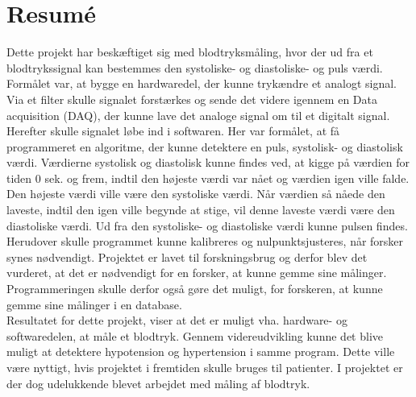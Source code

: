 \chapter{Resumé}
Dette projekt har beskæftiget sig med blodtryksmåling, hvor der ud fra et blodtrykssignal kan bestemmes den systoliske- og diastoliske- og puls værdi. Formålet var, at bygge en hardwaredel, der kunne trykændre et analogt signal. Via et filter skulle signalet forstærkes og sende det videre igennem en Data acquisition (DAQ), der kunne lave det analoge signal om til et digitalt signal. Herefter skulle signalet løbe ind i softwaren. Her var formålet, at få programmeret en algoritme, der kunne detektere en puls, systolisk- og diastolisk værdi. Værdierne systolisk og diastolisk kunne findes ved, at kigge på værdien for tiden 0 sek. og frem, indtil den højeste værdi var nået og værdien igen ville falde. Den højeste værdi ville være den systoliske værdi. Når værdien så nåede den laveste, indtil den igen ville begynde at stige, vil denne laveste værdi være den diastoliske værdi. Ud fra den systoliske- og diastoliske værdi kunne pulsen findes. \\
Herudover skulle programmet kunne kalibreres og nulpunktsjusteres, når forsker synes nødvendigt. Projektet er lavet til forskningsbrug og derfor blev det vurderet, at det er nødvendigt for en forsker, at kunne gemme sine målinger. Programmeringen skulle derfor også gøre det muligt, for forskeren, at kunne gemme sine målinger i en database.  \\
Resultatet for dette projekt, viser at det er muligt vha. hardware- og softwaredelen, at måle et blodtryk. Gennem videreudvikling kunne det blive muligt at detektere hypotension og hypertension i samme program. Dette ville være nyttigt, hvis projektet i fremtiden skulle bruges til patienter. I projektet er der dog udelukkende blevet arbejdet med måling af blodtryk. 
